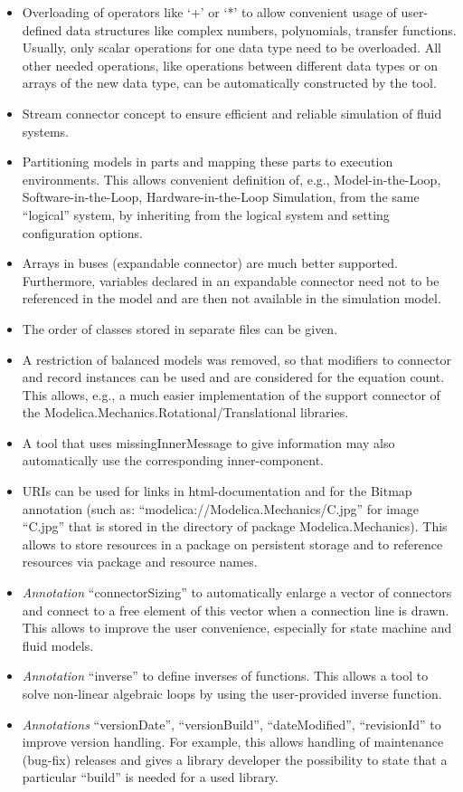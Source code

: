 \documentclass[10pt,a4paper]{report}
\begin{document}
\begin{itemize}
\item
  Overloading of operators like `+' or `*' to allow convenient usage of
  user-defined data structures like complex numbers, polynomials,
  transfer functions. Usually, only scalar operations for one data type
  need to be overloaded. All other needed operations, like operations
  between different data types or on arrays of the new data type, can be
  automatically constructed by the tool.
\item
  Stream connector concept to ensure efficient and reliable simulation
  of fluid systems.
\item
  Partitioning models in parts and mapping these parts to execution
  environments. This allows convenient definition of, e.g.,
  Model-in-the-Loop, Software-in-the-Loop, Hardware-in-the-Loop
  Simulation, from the same ``logical'' system, by inheriting from the
  logical system and setting configuration options.
\item
  Arrays in buses (expandable connector) are much better supported.
  Furthermore, variables declared in an expandable connector need not to
  be referenced in the model and are then not available in the
  simulation model.
\item
  The order of classes stored in separate files can be given.
\item
  A restriction of balanced models was removed, so that modifiers to
  connector and record instances can be used and are considered for the
  equation count. This allows, e.g., a much easier implementation of the
  support connector of the Modelica.Mechanics.Rotational/Translational
  libraries.
\item
  A tool that uses missingInnerMessage to give information may also
  automatically use the corresponding inner-component.
\item
  URIs can be used for links in html-documentation and for the Bitmap
  annotation (such as: ``modelica://Modelica.Mechanics/C.jpg'' for image
  ``C.jpg'' that is stored in the directory of package
  Modelica.Mechanics). This allows to store resources in a package on
  persistent storage and to reference resources via package and resource
  names.
\item
  \emph{Annotation} ``connectorSizing'' to automatically enlarge a
  vector of connectors and connect to a free element of this vector when
  a connection line is drawn. This allows to improve the user
  convenience, especially for state machine and fluid models.
\item
  \emph{Annotation} ``inverse'' to define inverses of functions. This
  allows a tool to solve non-linear algebraic loops by using the
  user-provided inverse function.
\item
  \emph{Annotations} ``versionDate'', ``versionBuild'',
  ``dateModified'', ``revisionId'' to improve version handling. For
  example, this allows handling of maintenance (bug-fix) releases and
  gives a library developer the possibility to state that a particular
  ``build'' is needed for a used library.
\end{itemize}
\end{document}

